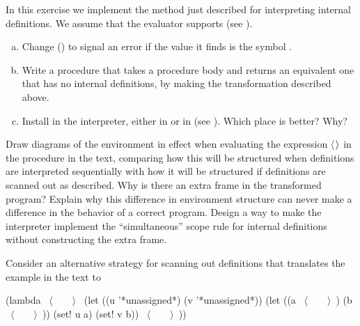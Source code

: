 \begin{exerciseGroup}
\label{Exercise 4.16}
 In this exercise we implement the
method just described for interpreting internal definitions.  We assume that
the evaluator supports  (see ).

\begin{enumerate}[a.]

\item
Change  () to signal an error if
the value it finds is the symbol .

\item
Write a procedure  that takes a procedure body and
returns an equivalent one that has no internal definitions, by making the
transformation described above.

\item
Install  in the interpreter, either in
 or in  (see ).
Which place is better?  Why?

\end{enumerate}

\label{Exercise 4.17}
 Draw diagrams of the environment
in effect when evaluating the expression \( \langle \)\( \kern0.1em\rangle \) in the procedure in the
text, comparing how this will be structured when definitions are interpreted
sequentially with how it will be structured if definitions are scanned out as
described.  Why is there an extra frame in the transformed program?  Explain
why this difference in environment structure can never make a difference in the
behavior of a correct program.  Design a way to make the interpreter implement
the ``simultaneous'' scope rule for internal definitions without constructing
the extra frame.

\label{Exercise 4.18}
 Consider an alternative strategy
for scanning out definitions that translates the example in the text to

\begin{codeBlock}
(lambda ~\(\langle \)~~~~\(\rangle \)~
  (let ((u '*unassigned*) (v '*unassigned*))
    (let ((a ~\(\langle \)~~~~\(\rangle \)~) (b ~\(\langle \)~~~~\(\rangle \)~))
      (set! u a)
      (set! v b))
    ~\(\langle \)~~~~\(\rangle \)~))
\end{codeBlock}


\end{exerciseGroup}
